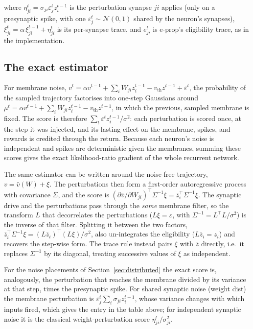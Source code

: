 \documentclass[10pt,twocolumn]{article}
\begin{document}
\noindent where $\eta^t_{ji}=\sigma_{ji}\varepsilon^t_j z^{t-1}_i$ is the
perturbation synapse $ji$ applies (only on a presynaptic spike, with one
$\varepsilon^t_j\sim\mathcal N(0,1)$ shared by the neuron's synapses),
$\xi^t_{ji}=\alpha\,\xi^{t-1}_{ji}+\eta^t_{ji}$ is its per-synapse trace, and
$e^t_{ji}$ is e-prop's eligibility trace, as in the implementation.

\subsection{The exact estimator}
\label{app:trace-exact}

For membrane noise, $v^t=\alpha v^{t-1}+\sum_i W_{ji}z^{t-1}_i-v_{\mathrm{th}}z^{t-1}+\varepsilon^t$,
the probability of the sampled trajectory factorises into one-step Gaussians
around $\mu^t=\alpha v^{t-1}+\sum_iW_{ji}z^{t-1}_i-v_{\mathrm{th}}z^{t-1}$, in
which the previous, sampled membrane is fixed. The score is therefore
$\sum_t\varepsilon^t z^{t-1}_i/\sigma^2$: each perturbation is scored once,
at the step it was injected, and its lasting effect on the membrane, spikes,
and rewards is credited through the return. Because each neuron's noise is
independent and spikes are deterministic given the membranes, summing these
scores gives the exact likelihood-ratio gradient of the whole recurrent
network.

The same estimator can be written around the noise-free trajectory,
$v=\bar v(W)+\xi$. The perturbations then form a first-order autoregressive
process with covariance $\Sigma$, and the score is
$(\partial\bar v/\partial W_{ji})^{\!\top}\Sigma^{-1}\xi=\bar z_i^{\top}\Sigma^{-1}\xi$.
The synaptic drive and the perturbations pass through the \emph{same} membrane
filter, so the transform $L$ that decorrelates the perturbations
($L\xi=\varepsilon$, with $\Sigma^{-1}=L^{\top}L/\sigma^2$) is the inverse of
that filter. Splitting it between the two factors,
$\bar z_i^{\top}\Sigma^{-1}\xi=(L\bar z_i)^{\top}(L\xi)/\sigma^2$, also
un-integrates the eligibility ($L\bar z_i=z_i$) and recovers the step-wise form.
The trace rule instead pairs $\xi$ with $\bar z$ directly, i.e.\ it replaces
$\Sigma^{-1}$ by its diagonal, treating successive values of $\xi$ as
independent.

For the noise placements of Section~\ref{sec:distributed} the exact score is,
analogously, the perturbation that reaches the membrane divided by its
variance at that step, times the presynaptic spike. For shared synaptic noise
(weight dist) the membrane perturbation is
$\varepsilon^t_j\sum_i\sigma_{ji}z^{t-1}_i$, whose variance changes with which
inputs fired, which gives the entry in the table above; for independent
synaptic noise it is the classical weight-perturbation score
$\eta^t_{ji}/\sigma_{ji}^2$.
\end{document}

